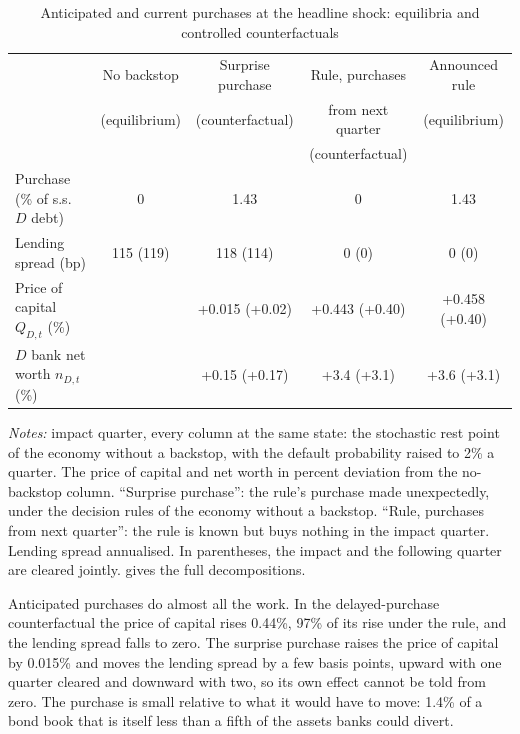 \begin{table}[htbp]
\centering
\caption{Anticipated and current purchases at the headline shock: equilibria and controlled
counterfactuals}
\label{tab:mechanism}
\footnotesize
\setlength{\tabcolsep}{2.5pt}
\begin{tabular}{lcccc}
\toprule
 & No backstop & Surprise purchase & Rule, purchases & Announced rule \\
 & (equilibrium) & (counterfactual) & from next quarter & (equilibrium) \\
 & & & (counterfactual) & \\
\midrule
Purchase (\% of s.s.\ $D$ debt) & 0 & 1.43 & 0 & 1.43 \\
Lending spread (bp) & 115 (119) & 118 (114) & 0 (0) & 0 (0) \\
Price of capital $Q_{D,t}$ (\%) & & +0.015 (+0.02) & +0.443 (+0.40) & +0.458 (+0.40) \\
$D$ bank net worth $n_{D,t}$ (\%) & & +0.15 (+0.17) & +3.4 (+3.1) & +3.6 (+3.1) \\
\bottomrule
\end{tabular}
\par\medskip
\begin{minipage}{0.95\linewidth}\footnotesize
\emph{Notes:} impact quarter, every column at the same state: the stochastic rest point of the
economy without a backstop, with the default probability raised to 2\% a quarter. The price of
capital and net worth in percent deviation from the no-backstop column. ``Surprise purchase'':
the rule's purchase made unexpectedly, under the decision rules of the economy without a
backstop. ``Rule, purchases from next quarter'': the rule is known but buys nothing in the impact
quarter. Lending spread annualised. In parentheses, the impact and the following quarter are
cleared jointly.  gives the full decompositions.
\end{minipage}
\end{table}

Anticipated purchases do almost all the work. In the delayed-purchase counterfactual the price of
capital rises 0.44\%, 97\% of its rise under the rule, and the lending spread falls to zero. The
surprise purchase raises the price of capital by 0.015\% and moves the lending spread by a few
basis points, upward with one quarter cleared and downward with two, so its own effect cannot be
told from zero. The purchase is small relative to what it would have to move: 1.4\% of a bond
book that is itself less than a fifth of the assets banks could divert.

